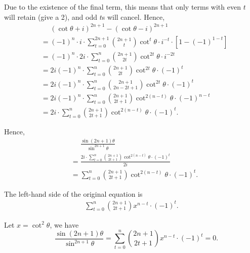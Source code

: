 \begin{enumerate}
          Due to the existence of the final term, this means that only terms with even \(t\) will retain (give a 2), and odd \(t\)s will cancel. Hence,
          \begin{align*}
               & \phantom{=} (\cot \theta + i)^{2n + 1} - (\cot \theta - i)^{2n + 1}                                                           \\
               & = (-1)^n \cdot i \cdot \sum_{t = 0}^{2n + 1} \binom{2n + 1}{t} \cot^t \theta \cdot i^{-t} \cdot \left[1 - (-1)^{1 - t}\right] \\
               & = (-1)^n \cdot 2i \cdot \sum_{t = 0}^{n} \binom{2n + 1}{2t} \cot^{2t} \theta \cdot i^{-2t}                                    \\
               & = 2i(-1)^n \cdot \sum_{t = 0}^{n} \binom{2n + 1}{2t} \cot^{2t} \theta \cdot (-1)^t                                            \\
               & = 2i(-1)^n \cdot \sum_{t = 0}^{n} \binom{2n + 1}{2n - 2t + 1} \cot^{2t} \theta \cdot (-1)^t                                   \\
               & = 2i(-1)^n \cdot \sum_{t = 0}^{n} \binom{2n + 1}{2t + 1} \cot^{2 (n - t)} \theta \cdot (-1)^{n - t}                           \\
               & = 2i \cdot \sum_{t = 0}^{n} \binom{2n + 1}{2t + 1} \cot^{2 (n - t)} \theta \cdot (-1)^{t}.
          \end{align*}

          Hence,
          \begin{align*}
               & \phantom{=} \frac{\sin (2n + 1) \theta}{\sin^{2n + 1} \theta}                                        \\
               & = \frac{2i \cdot \sum_{t = 0}^{n} \binom{2n + 1}{2t + 1} \cot^{2 (n - t)} \theta \cdot (-1)^{t}}{2i} \\
               & = \sum_{t = 0}^{n} \binom{2n + 1}{2t + 1} \cot^{2 (n - t)} \theta \cdot (-1)^{t}.
          \end{align*}

          The left-hand side of the original equation is
          \begin{align*}
              \sum_{t = 0}^{n} \binom{2n + 1}{2t + 1} x^{n - t} \cdot (-1)^t.
          \end{align*}

          Let \(x = \cot^2 \theta\), we have
          \[
              \phantom{=} \frac{\sin (2n + 1) \theta}{\sin^{2n + 1} \theta} = \sum_{t = 0}^{n} \binom{2n + 1}{2t + 1} x^{n - t} \cdot (-1)^t = 0.
          \]


\end{enumerate}
